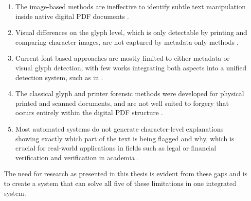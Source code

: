 \begin{enumerate}
    \item The image-based methods are ineffective to identify subtle text manipulation inside native digital PDF documents \cite{Cohen2025Forgery,Qu2023TamperedText}.

    \item Visual differences on the glyph level, which is only detectable by printing and comparing character images, are not captured by metadata-only methods \cite{Chen2022FontForgery,Zhang2023PDFLayout}.

    \item Current font-based approaches are mostly limited to either metadata or visual glyph detection, with few works integrating both aspects into a unified detection system, such as in \cite{Chen2022FontForgery, Zhang2023PDFLayout}.

    \item The classical glyph and printer forensic methods were developed for physical printed and scanned documents, and are not well suited to forgery that occurs entirely within the digital PDF structure \cite{Bertrand2013Intrinsic,Bertrand2015CRF,Chernyshova2018Font}.

    \item Most automated systems do not generate character-level explanations showing exactly which part of the text is being flagged and why, which is crucial for real-world applications in fields such as legal or financial verification and verification in academia \cite{Luo2024Explainable, Nikkel2020Fintech}.
\end{enumerate}

The need for research as presented in this thesis is evident from these gaps and is to create a system that can solve all five of these limitations in one integrated system. 